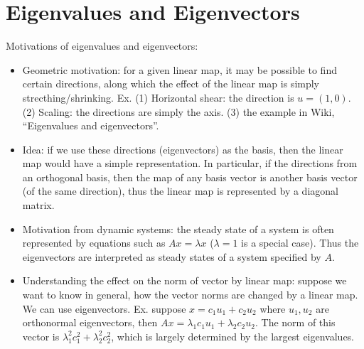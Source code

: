 \documentclass{report}
\begin{document}
\section{Eigenvalues and Eigenvectors}

Motivations of eigenvalues and eigenvectors: 
\begin{itemize}
	\item Geometric motivation: for a given linear map, it may be possible to find certain directions, along which the effect of the linear map is simply strecthing/shrinking. Ex. (1) Horizontal shear: the direction is $u = (1,0)$. (2) Scaling: the directions are simply the axis. (3) the example in Wiki, ``Eigenvalues and eigenvectors''. 
	
	\item Idea: if we use these directions (eigenvectors) as the basis, then the linear map would have a simple representation. In particular, if the directions from an orthogonal basis, then the map of any basis vector is another basis vector (of the same direction), thus the linear map is represented by a diagonal matrix. 
	
	\item Motivation from dynamic systems: the steady state of a system is often represented by equations such as $Ax = \lambda x$ ($\lambda = 1$ is a special case). Thus the eigenvectors are interpreted as steady states of a system specified by $A$. 
	
	\item Understanding the effect on the norm of vector by linear map: suppose we want to know in general, how the vector norms are changed by a linear map. We can use eigenvectors. Ex. suppose $x = c_1 u_1 + c_2 u_2$ where $u_1, u_2$ are orthonormal eigenvectors, then $Ax = \lambda_1 c_1 u_1 + \lambda_2 c_2 u_2$. The norm of this vector is $\lambda_1^2 c_1^2 + \lambda_2^2 c_2^2$, which is largely determined by the largest eigenvalues. 
\end{itemize}
\end{document}
